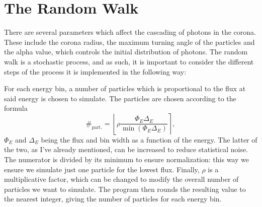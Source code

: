 \section{The Random Walk}
\label{sec:RandomWalk}

There are several parameters which affect the cascading of photons in the corona. These include the corona radius, the maximum turning angle of the particles and the alpha value, which controls the initial distribution of photons. The random walk is a stochastic process, and as such, it is important to consider the different steps of the process it is implemented in the following way:

For each energy bin, a number of particles which is proportional to the flux at said energy is chosen to simulate. The particles are chosen according to the formula
\begin{equation}
    \#_{\text{part.}}=\left\lfloor \rho \frac{\Phi_E \Delta_E}{\min(\Phi_E \Delta_E)} \right\rceil,
\end{equation}
$\Phi_E$ and $\Delta_E$ being the flux and bin width as a function of the energy. The latter of the two, as I've already mentioned, can be increased to reduce statistical noise. The numerator is divided by its minimum to ensure normalization: this way we ensure we simulate just one particle for the lowest flux. Finally, $\rho$ is a multiplicative factor, which can be changed to modify the overall number of particles we want to simulate. The program then rounds the resulting value to the nearest integer, giving the number of particles for each energy bin.

